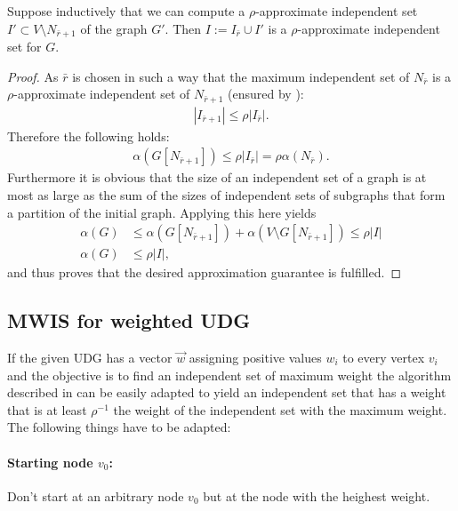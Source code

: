 \begin{theorem}
Suppose inductively that we can compute a $\rho$-approximate independent set $I'\subset V\setminus N_{\bar r+1}$ of the graph $G'$. Then $I:=I_{\bar r} \cup I'$ is a  $\rho$-approximate independent set for $G$.
\end{theorem}
\begin{proof}
As $\bar r$ is chosen in such a way that the maximum independent set of $N_{\bar r}$ is a $\rho$-approximate independent set of $N_{\bar r +1}$  (ensured by ):
\begin{align*}
|I_{\bar r +1}| \leq \rho|I_{\bar r}|.
\end{align*}
Therefore the following holds:
\begin{align*}
\alpha(G[N_{\bar r +1}]) \leq \rho|I_{\bar r}|  = \rho\alpha(N_{\bar r}).
\end{align*}
Furthermore it is obvious that the size of an independent set of a graph is at most as large as the sum of the sizes of independent sets of subgraphs that form a partition of the initial graph. Applying this here yields
\begin{align*}
\alpha(G)& \leq \alpha(G[N_{\bar r +1 }]) + \alpha(V\setminus G[N_{\bar r +1}]) \leq \rho|I|\\
\alpha(G)& \leq  \rho|I|,
\end{align*} and thus proves that the desired approximation guarantee is fulfilled.
\end{proof}
\subsection{MWIS for weighted UDG}\label{sec:mwisudg}
If the given UDG has a vector $\vec w$ assigning positive values $w_i$ to every vertex $v_i$ and the objective is to find an independent set of maximum weight the algorithm described in  can be easily adapted to yield an independent set that has a weight that is at least $\rho^{-1}$ the weight of the independent set with the maximum weight.
The following things have to be adapted:
\paragraph{Starting node $v_0$:} Don't start at an arbitrary node $v_0$ but at the node with the heighest weight.
